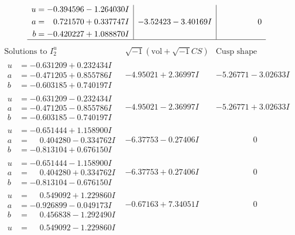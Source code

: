 \documentclass[1p]{elsarticle_modified}
\theoremstyle{definition}
\newcommand{\I}{\sqrt{-1}}
\begin{document}
$$\begin{array}{c|c|c}
\begin{aligned}
u &= -0.394596 - 1.264030 I \\
a &= \phantom{-}0.721570 + 0.337747 I \\
b &= -0.420227 + 1.088870 I\end{aligned}
 & -3.52423 - 3.40169 I & \phantom{-0.000000 } 0\\
 \hline 
 \end{array}$$\newpage$$\begin{array}{c|c|c}  
\text{Solutions to }I^u_{2}& \I (\text{vol} + \sqrt{-1}CS) & \text{Cusp shape}\\
 \hline 
\begin{aligned}
u &= -0.631209 + 0.232434 I \\
a &= -0.471205 + 0.855786 I \\
b &= -0.603185 + 0.740197 I\end{aligned}
 & -4.95021 + 2.36997 I & -5.26771 - 3.02633 I \\ \hline\begin{aligned}
u &= -0.631209 - 0.232434 I \\
a &= -0.471205 - 0.855786 I \\
b &= -0.603185 - 0.740197 I\end{aligned}
 & -4.95021 - 2.36997 I & -5.26771 + 3.02633 I \\ \hline\begin{aligned}
u &= -0.651444 + 1.158900 I \\
a &= \phantom{-}0.404280 - 0.334762 I \\
b &= -0.813104 + 0.676150 I\end{aligned}
 & -6.37753 - 0.27406 I & \phantom{-0.000000 } 0 \\ \hline\begin{aligned}
u &= -0.651444 - 1.158900 I \\
a &= \phantom{-}0.404280 + 0.334762 I \\
b &= -0.813104 - 0.676150 I\end{aligned}
 & -6.37753 + 0.27406 I & \phantom{-0.000000 } 0 \\ \hline\begin{aligned}
u &= \phantom{-}0.549092 + 1.229860 I \\
a &= -0.926899 - 0.049173 I \\
b &= \phantom{-}0.456838 - 1.292490 I\end{aligned}
 & -0.67163 + 7.34051 I & \phantom{-0.000000 } 0 \\ \hline\begin{aligned}
u &= \phantom{-}0.549092 - 1.229860 I \\

\end{aligned}
\end{array}$$
\end{document}
